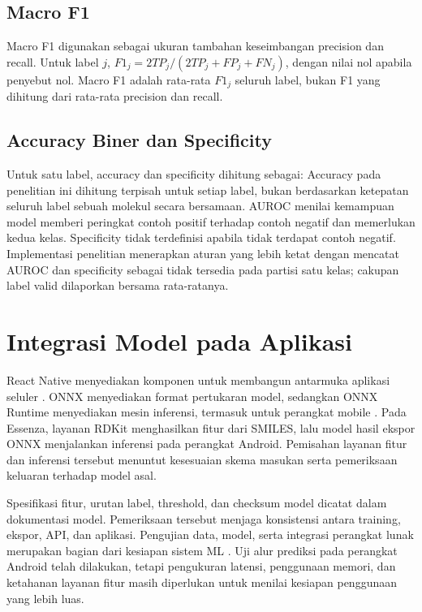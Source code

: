 \subsection{Macro F1}

Macro F1 digunakan sebagai ukuran tambahan keseimbangan precision dan recall. Untuk label $j$, $F1_j=2TP_j/(2TP_j+FP_j+FN_j)$, dengan nilai nol apabila penyebut nol. Macro F1 adalah rata-rata $F1_j$ seluruh label, bukan F1 yang dihitung dari rata-rata precision dan recall.

\subsection{Accuracy Biner dan Specificity}

Untuk satu label, accuracy dan specificity dihitung sebagai:
Accuracy pada penelitian ini dihitung terpisah untuk setiap label, bukan berdasarkan ketepatan seluruh label sebuah molekul secara bersamaan. AUROC menilai kemampuan model memberi peringkat contoh positif terhadap contoh negatif dan memerlukan kedua kelas. Specificity tidak terdefinisi apabila tidak terdapat contoh negatif. Implementasi penelitian menerapkan aturan yang lebih ketat dengan mencatat AUROC dan specificity sebagai tidak tersedia pada partisi satu kelas; cakupan label valid dilaporkan bersama rata-ratanya.

\section{Integrasi Model pada Aplikasi}

React Native menyediakan komponen untuk membangun antarmuka aplikasi seluler \cite{reactnative2024}. ONNX menyediakan format pertukaran model, sedangkan ONNX Runtime menyediakan mesin inferensi, termasuk untuk perangkat mobile \cite{onnxmobile2026}. Pada Essenza, layanan RDKit menghasilkan fitur dari SMILES, lalu model hasil ekspor ONNX menjalankan inferensi pada perangkat Android. Pemisahan layanan fitur dan inferensi tersebut menuntut kesesuaian skema masukan serta pemeriksaan keluaran terhadap model asal.

Spesifikasi fitur, urutan label, threshold, dan checksum model dicatat dalam dokumentasi model. Pemeriksaan tersebut menjaga konsistensi antara training, ekspor, API, dan aplikasi. Pengujian data, model, serta integrasi perangkat lunak merupakan bagian dari kesiapan sistem ML \cite{breck2017}. Uji alur prediksi pada perangkat Android telah dilakukan, tetapi pengukuran latensi, penggunaan memori, dan ketahanan layanan fitur masih diperlukan untuk menilai kesiapan penggunaan yang lebih luas.
